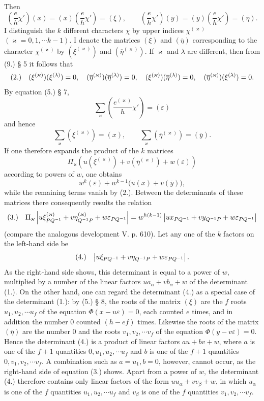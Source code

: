 \documentclass[11pt]{article}
\makeatletter
\newcommand{\frobtag}[2]{\[\begin{array}{@{}r@{\quad}l@{}}\textup{(#1)} & \displaystyle #2\end{array}\]}
\newcommand{\frobtagc}[2]{\[\begin{array}{@{}r@{\quad}c@{}}\textup{(#1)} & \displaystyle #2\end{array}\]}
\makeatother
\begin{document}
\clearpage
Then
\[
\left(\frac{e}{h}\chi'\right)(x)=(x)\left(\frac{e}{h}\chi'\right)=(\xi),
\qquad
\left(\frac{e}{h}\chi'\right)(\overline{y})=(\overline{y})\left(\frac{e}{h}\chi'\right)=(\overline{\eta}).
\]
I distinguish the $k$ different characters $\chi$ by upper indices $\chi^{(\varkappa)}$ $(\varkappa=0,1,\cdots k-1)$. I denote the matrices $(\xi)$ and $(\overline{\eta})$ corresponding to the character $\chi^{(\varkappa)}$ by $(\xi^{(\varkappa)})$ and $(\overline{\eta}^{(\varkappa)})$. If $\varkappa$ and $\lambda$ are different, then from (9.) § 5 it follows that
\frobtagc{2.}{(\xi^{(\varkappa)})(\xi^{(\lambda)})=0,\quad (\overline{\eta}^{(\varkappa)})(\overline{\eta}^{(\lambda)})=0,\quad (\xi^{(\varkappa)})(\overline{\eta}^{(\lambda)})=0,\quad (\overline{\eta}^{(\varkappa)})(\xi^{(\lambda)})=0.}
By equation (5.) § 7,
\[
\sum_\varkappa\left(\frac{e^{(\varkappa)}}{h}\chi'\right)=(\varepsilon)
\]
and hence
\[
\sum_\varkappa(\xi^{(\varkappa)})=(x),\qquad \sum_\varkappa(\overline{\eta}^{(\varkappa)})=(\overline{y}).
\]
If one therefore expands the product of the $k$ matrices
\[
\Pi_\varkappa\left(u(\xi^{(\varkappa)})+v(\overline{\eta}^{(\varkappa)})+w(\varepsilon)\right)
\]
according to powers of $w$, one obtains
\[
w^k(\varepsilon)+w^{k-1}\bigl(u(x)+v(\overline{y})\bigr),
\]
while the remaining terms vanish by (2.). Between the determinants of these matrices there consequently results the relation
\frobtag{3.}{\Pi_\varkappa\left|u\xi_{PQ^{-1}}^{(\varkappa)}+v\eta_{Q^{-1}P}^{(\varkappa)}+w\varepsilon_{PQ^{-1}}\right|=w^{h(k-1)}\left|ux_{PQ^{-1}}+vy_{Q^{-1}P}+w\varepsilon_{PQ^{-1}}\right|}
(compare the analogous development V. p. 610). Let any one of the $k$ factors on the left-hand side be
\frobtagc{4.}{\left|u\xi_{PQ^{-1}}+v\eta_{Q^{-1}P}+w\varepsilon_{PQ^{-1}}\right|.}
As the right-hand side shows, this determinant is equal to a power of $w$, multiplied by a number of the linear factors $ua_\alpha+vb_\alpha+w$ of the determinant (1.). On the other hand, one can regard the determinant (4.) as a special case of the determinant (1.): by (5.) § 8, the roots of the matrix $(\xi)$ are the $f$ roots $u_1,u_2,\cdots u_f$ of the equation $\Phi(x-u\varepsilon)=0$, each counted $e$ times, and in addition the number $0$ counted $(h-ef)$ times. Likewise the roots of the matrix $(\overline{\eta})$ are the number $0$ and the roots $v_1,v_2,\cdots v_f$ of the equation $\Phi(y-v\varepsilon)=0$. Hence the determinant (4.) is a product of linear factors $au+bv+w$, where $a$ is one of the $f+1$ quantities $0,u_1,u_2,\cdots u_f$ and $b$ is one of the $f+1$ quantities $0,v_1,v_2,\cdots v_f$. A combination such as $a=u_1,b=0$, however, cannot occur, as the right-hand side of equation (3.) shows. Apart from a power of $w$, the determinant (4.) therefore contains only linear factors of the form $uu_\alpha+vv_\beta+w$, in which $u_\alpha$ is one of the $f$ quantities $u_1,u_2,\cdots u_f$ and $v_\beta$ is one of the $f$ quantities $v_1,v_2,\cdots v_f$.
\end{document}
